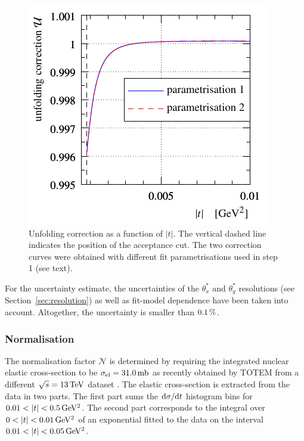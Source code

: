 \begin{figure}
\begin{center}
\includegraphics{fig/unfolding_num_int_model_cmp.pdf}
\caption{%
Unfolding correction as a function of $|t|$. The vertical dashed line indicates the position of the acceptance cut. The two correction curves were obtained with different fit parametrisations used in step 1 (see text).
}
\label{fig:unfolding}
\end{center}
\end{figure}

For the uncertainty estimate, the uncertainties of the $\theta_x^*$ and $\theta_y^*$ resolutions (see Section~\ref{sec:resolution}) as well as fit-model dependence have been taken into account. Altogether, the uncertainty is smaller than $0.1\,{\rm \%}$.




\subsubsection{Normalisation}
\label{sec:normalisation}

The normalisation factor $\mathcal{N}$ is determined by requiring the integrated nuclear elastic cross-section to be $\sigma_{\rm el} = 31.0\,{\rm mb}$ as recently obtained by TOTEM from a different $\sqrt s = 13\,{\rm TeV}$ dataset \cite{totem-13tev-90m}. The elastic cross-section is extracted from the data in two parts. The first part sums the ${\rm d}\sigma/{\rm d} t$ histogram bins for $0.01 < |t| < 0.5\,{\rm GeV^2}$. The second part corresponds to the integral over $0 < |t| < 0.01\,{\rm GeV^2}$ of an exponential fitted to the data on the interval $0.01 < |t| < 0.05\,{\rm GeV^2}$.

